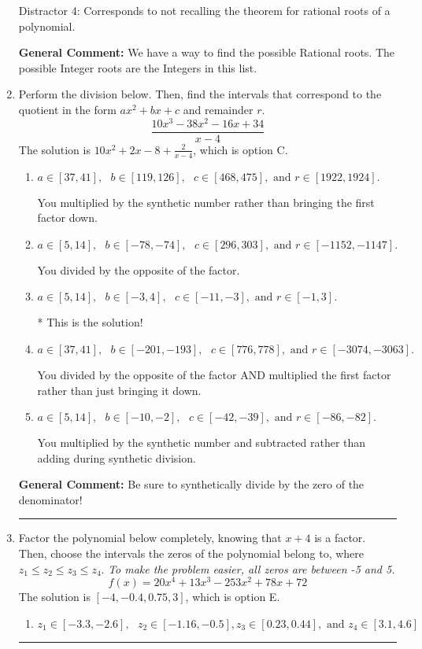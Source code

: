 \documentclass{extbook}[14pt]
\newcommand{\litem}[1]{\item #1

\rule{\textwidth}{0.4pt}}
\begin{document}
\begin{enumerate}
{\begin{enumerate}[label=\Alph*.]
 Distractor 4: Corresponds to not recalling the theorem for rational roots of a polynomial.
\end{enumerate}

\textbf{General Comment:} We have a way to find the possible Rational roots. The possible Integer roots are the Integers in this list.
}
\litem{
Perform the division below. Then, find the intervals that correspond to the quotient in the form $ax^2+bx+c$ and remainder $r$.
\[ \frac{10x^{3} -38 x^{2} -16 x + 34}{x -4} \]The solution is \( 10x^{2} +2 x -8 + \frac{2}{x -4} \), which is option C.\begin{enumerate}[label=\Alph*.]
\item \( a \in [37, 41], \text{   } b \in [119, 126], \text{   } c \in [468, 475], \text{   and   } r \in [1922, 1924]. \)

 You multiplied by the synthetic number rather than bringing the first factor down.
\item \( a \in [5, 14], \text{   } b \in [-78, -74], \text{   } c \in [296, 303], \text{   and   } r \in [-1152, -1147]. \)

 You divided by the opposite of the factor.
\item \( a \in [5, 14], \text{   } b \in [-3, 4], \text{   } c \in [-11, -3], \text{   and   } r \in [-1, 3]. \)

* This is the solution!
\item \( a \in [37, 41], \text{   } b \in [-201, -193], \text{   } c \in [776, 778], \text{   and   } r \in [-3074, -3063]. \)

 You divided by the opposite of the factor AND multiplied the first factor rather than just bringing it down.
\item \( a \in [5, 14], \text{   } b \in [-10, -2], \text{   } c \in [-42, -39], \text{   and   } r \in [-86, -82]. \)

 You multiplied by the synthetic number and subtracted rather than adding during synthetic division.
\end{enumerate}

\textbf{General Comment:} Be sure to synthetically divide by the zero of the denominator!
}
\litem{
Factor the polynomial below completely, knowing that $x + 4$ is a factor. Then, choose the intervals the zeros of the polynomial belong to, where $z_1 \leq z_2 \leq z_3 \leq z_4$. \textit{To make the problem easier, all zeros are between -5 and 5.}
\[ f(x) = 20x^{4} +13 x^{3} -253 x^{2} +78 x + 72 \]The solution is \( [-4, -0.4, 0.75, 3] \), which is option E.\begin{enumerate}[label=\Alph*.]
\item \( z_1 \in [-3.3, -2.6], \text{   }  z_2 \in [-1.16, -0.5], z_3 \in [0.23, 0.44], \text{   and   } z_4 \in [3.1, 4.6] \)


\end{enumerate}}
\end{enumerate}
\end{document}
